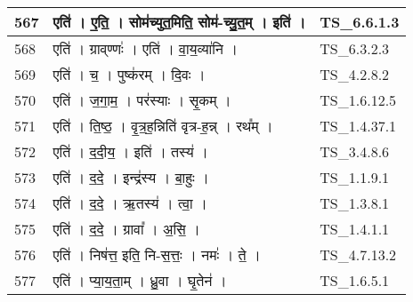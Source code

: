 \documentclass[17pt]{extarticle}
\begin{document}
\begin{longtable}{||p{0.4in}||p{4.9in}||p{0.9in}||}
    \hline
        
    567 & एति॑   ।   ए॒ति॒   ।   सोम॑च्युत॒मिति॒ सोम॑{-}च्यु॒त॒म्   ।   इति॑   ।    & TS\_6.6.1.3       \\
    
    \hline
        
    568 & एति॑   ।   ग्राव्‌ण्णः॑   ।   एति॑   ।   वा॒य॒व्या॑नि   ।    & TS\_6.3.2.3       \\
    
    \hline
        
    569 & एति॑   ।   च॒   ।   पुष्क॑रम्   ।   दि॒वः   ।    & TS\_4.2.8.2       \\
    
    \hline
        
    570 & एति॑   ।   ज॒गा॒म॒   ।   पर॑स्याः   ।   सृ॒कम्   ।    & TS\_1.6.12.5       \\
    
    \hline
        
    571 & एति॑   ।   ति॒ष्ठ॒   ।   वृ॒त्र॒ह॒न्निति॑ वृत्र{-}ह॒न्न्   ।   रथ᳚म्   ।    & TS\_1.4.37.1       \\
    
    \hline
        
    572 & एति॑   ।   द॒दी॒य॒   ।   इति॑   ।   तस्य॑   ।    & TS\_3.4.8.6       \\
    
    \hline
        
    573 & एति॑   ।   द॒दे॒   ।   इन्द्र॑स्य   ।   बा॒हुः   ।    & TS\_1.1.9.1       \\
    
    \hline
        
    574 & एति॑   ।   द॒दे॒   ।   ऋ॒तस्य॑   ।   त्वा॒   ।    & TS\_1.3.8.1       \\
    
    \hline
        
    575 & एति॑   ।   द॒दे॒   ।   ग्रावा᳚   ।   अ॒सि॒   ।    & TS\_1.4.1.1       \\
    
    \hline
        
    576 & एति॑   ।   निष॑त्त॒ इति॒ नि{-}स॒त्तः॒   ।   नमः॑   ।   ते॒   ।    & TS\_4.7.13.2       \\
    
    \hline
        
    577 & एति॑   ।   प्या॒य॒ता॒म्   ।   ध्रु॒वा   ।   घृ॒तेन॑   ।    & TS\_1.6.5.1       \\
    

\end{longtable}
\end{document}
